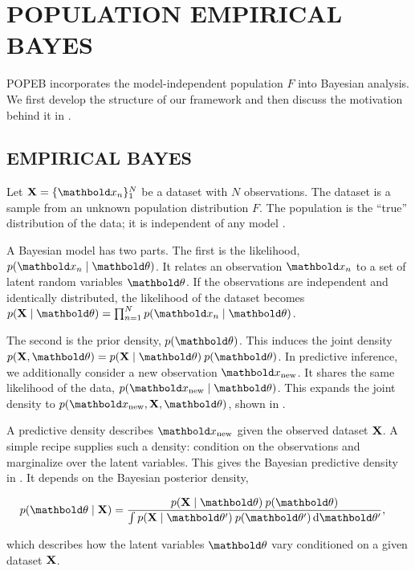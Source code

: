 
\section{POPULATION EMPIRICAL BAYES\hspace*{-20pt}}

\Gls{POPEB} incorporates the model-independent population $F$ into Bayesian
analysis. We first develop the structure of our framework and then discuss the
motivation behind it in .

\subsection{EMPIRICAL BAYES}

Let $\mbX = \{\mb{x}_n\}_1^N$ be a dataset with $N$ observations. The dataset
is a sample from an unknown population distribution $F$.
The population is the ``true'' distribution of the data; it is independent of
any model \citep{shao2003mathematical}.

A Bayesian model has two parts. The first is the likelihood,
$p(\mbx_n \mid \mbtheta)$. It relates an observation $\mbx_n$
to a set of latent random variables $\mbtheta$. If the observations are
independent and identically distributed, the likelihood of the dataset becomes
$p(\mbX \mid \mbtheta) = \prod_{n=1}^N p(\mbx_n \mid \mbtheta)$.

The second is the prior density, $p(\mbtheta)$.
This induces the joint density $p(\mbX, \mbtheta) = p(\mbX \mid
\mbtheta) \: p(\mbtheta)$. In predictive inference, we additionally consider a
new observation $\xnew$. It shares the same likelihood of the data,
$p(\xnew\mid\mbtheta)$. This expands the joint density to $p
(\xnew,\mbX,\mbtheta)$,
shown in .

A predictive density describes $\xnew$ given the observed dataset
$\textbf{X}$. A simple recipe supplies such a density: condition on the observations
and marginalize over the latent variables. This gives the Bayesian predictive
density in . It depends on the Bayesian posterior density,
\begin{linenomath}
\begin{align}
  p(\mbtheta \mid \mbX)
  &=
  \frac{p(\mbX \mid \mbtheta)
  \:
  p(\mbtheta)}
  {\int p(\mbX \mid \mbtheta^\prime)\:p(\mbtheta^\prime) \dif\mbtheta^\prime},
  \label{eq:post}
\end{align}
\end{linenomath}
which describes how the latent variables $\mbtheta$ vary conditioned on
a given dataset $\textbf{X}$.

